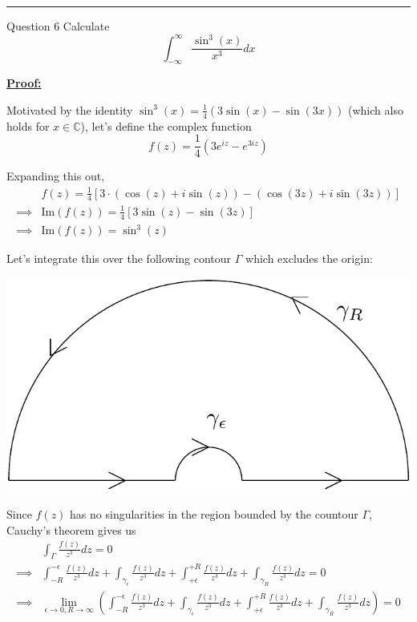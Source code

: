 \documentclass{article}
\newcommand{\C}{\mathbb{C}}
\begin{document}
\vskip 0.5cm
\hrule 
\vskip 0.5cm



\begin{mathdefinitionbox}{Question 6}
\vskip 0.5cm
Calculate 
\[ \int_{-\infty}^{\infty} \frac{\sin^3(x)}{x^3} dx  \]
\end{mathdefinitionbox}

\vskip 0.5cm
\underline{\textbf{Proof:}}


Motivated by the identity $\sin^3(x) = \frac{1}{4}\left( 3\sin(x) - \sin(3x) \right)$ (which also holds for $x \in \C$), let's define the complex function
\[ f(z) = \frac{1}{4} \left( 3e^{iz} - e^{3iz} \right) \]

Expanding this out,
\begin{align*}
  &f(z) = \frac{1}{4} \left[ 3 \cdot \left( \cos(z) + i\sin(z) \right) - \left( \cos(3z) + i\sin(3z) \right) \right] \\
  \implies&\text{Im}(f(z)) = \frac{1}{4} \left[ 3\sin(z) - \sin(3z) \right] \\
  \implies&\text{Im}(f(z)) = \sin^3(z)
\end{align*}

Let's integrate this over the following contour $\Gamma$ which excludes the origin:
\begin{center}
  \includegraphics*[scale=0.40]{Q6.png}
\end{center}

\vskip 0.5cm
Since $f(z)$ has no singularities in the region bounded by the countour $\Gamma$, Cauchy's theorem gives us 
\begin{align*}
  &\int_{\Gamma} \frac{f(z)}{z^3} dz = 0 \\
  \implies &\int_{-R}^{-\epsilon} \frac{f(z)}{z^3} dz + \int_{{\gamma_{\epsilon}}} \frac{f(z)}{z^3} dz + \int_{+\epsilon}^{+R} \frac{f(z)}{z^3} dz + \int_{{\gamma_R}} \frac{f(z)}{z^3} dz = 0 \\
  \implies &\lim_{\epsilon \rightarrow 0, R \rightarrow \infty} \left(\int_{-R}^{-\epsilon} \frac{f(z)}{z^3} dz + \int_{{\gamma_{\epsilon}}} \frac{f(z)}{z^3} dz + \int_{+\epsilon}^{+R} \frac{f(z)}{z^3} dz + \int_{{\gamma_R}} \frac{f(z)}{z^3} dz\right) = 0
\end{align*}
\end{document}

